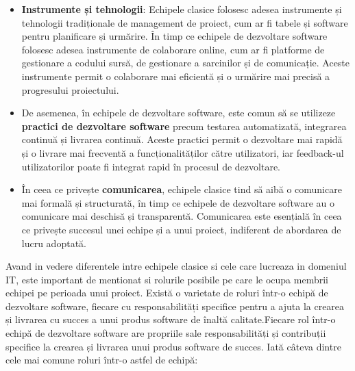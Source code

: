 \documentclass[a4paper, 12pt]{article}
\begin{document}
\begin {itemize}
	\item \textbf{ Instrumente și tehnologii}: Echipele clasice folosesc adesea instrumente și tehnologii tradiționale de management de proiect, cum ar fi tabele și software pentru planificare și urmărire. În timp ce echipele de dezvoltare software folosesc adesea instrumente de colaborare online, cum ar fi platforme de gestionare a codului sursă, de gestionare a sarcinilor și de comunicație. Aceste instrumente permit o colaborare mai eficientă și o urmărire mai precisă a progresului proiectului.

	\item De asemenea, în echipele de dezvoltare software, este comun să se utilizeze \textbf{practici de dezvoltare software} precum testarea automatizată, integrarea continuă și livrarea continuă. Aceste practici permit o dezvoltare mai rapidă și o livrare mai frecventă a funcționalităților către utilizatori, iar feedback-ul utilizatorilor poate fi integrat rapid în procesul de dezvoltare.

	\item În ceea ce privește \textbf{comunicarea}, echipele clasice tind să aibă o comunicare mai formală și structurată, în timp ce echipele de dezvoltare software au o comunicare mai deschisă și transparentă. Comunicarea este esențială în ceea ce privește succesul unei echipe și a unui proiect, indiferent de abordarea de lucru adoptată.

	\end{itemize}

	\quad Avand in vedere diferentele intre echipele clasice si cele care lucreaza in domeniul IT, este important de mentionat si rolurile posibile pe care le ocupa membrii echipei pe perioada unui proiect. Există o varietate de roluri într-o echipă de dezvoltare software, fiecare cu responsabilități specifice pentru a ajuta la crearea și livrarea cu succes a unui produs software de înaltă calitate.Fiecare rol într-o echipă de dezvoltare software are propriile sale responsabilități și contribuții specifice la crearea și livrarea unui produs software de succes.  Iată câteva dintre cele mai comune roluri într-o astfel de echipă:
\end{document}
